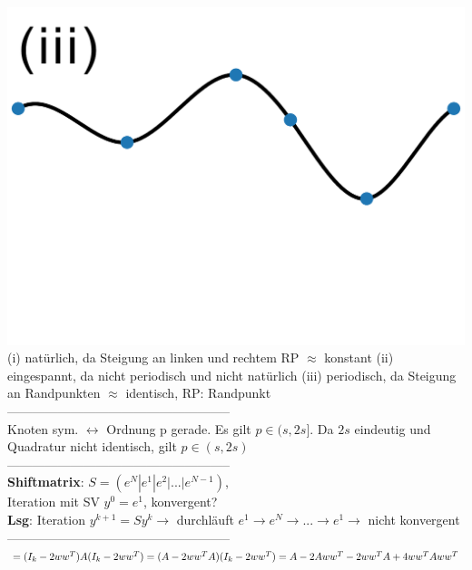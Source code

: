 \includegraphics[scale=0.08]{content/images/spline_iii.pdf}\\
(i) natürlich, da Steigung an linken und rechtem RP $\approx$ konstant (ii) eingespannt, da nicht periodisch und nicht natürlich (iii) periodisch, da Steigung an Randpunkten $\approx$ identisch, RP: Randpunkt\\
-----------------------------------------------------\\
Knoten sym. $\leftrightarrow$ Ordnung p gerade. Es gilt $p \in (s, 2s]$. Da $2s$ eindeutig und Quadratur nicht identisch, gilt $p \in (s, 2s)$\\
-----------------------------------------------------\\
\textbf{Shiftmatrix}: $S = (e^N | e^1 | e^2 | ... | e^{N-1})$,\\ \hspace*{1mm}Iteration mit SV $y^0 = e^1$, konvergent?\\
\hspace*{1mm}\textbf{Lsg}: Iteration $y^{k+1} = Sy^k \rightarrow$ durchläuft \hspace*{1mm} $e^1 \rightarrow e^N \rightarrow ... \rightarrow e^1 \rightarrow$ nicht konvergent\\
-----------------------------------------------------\\
 $ = (I_k - 2ww^T)A(I_k - 2ww^T) \\= (A - 2ww^TA)(I_k -2ww^T) \\= A-2Aww^T - 2ww^TA + 4ww^TAww^T$\\
